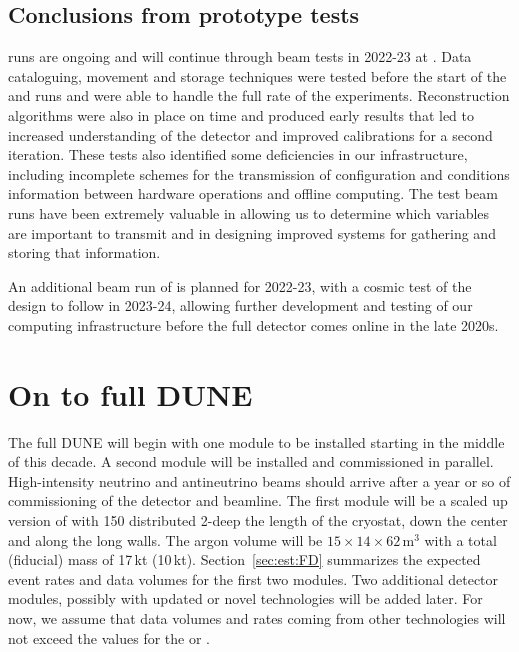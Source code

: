 \documentclass[../main-v1.tex]{subfiles}
\begin{document}
\subsection{Conclusions from prototype tests }

runs are ongoing and will continue through beam tests in 2022-23 at .  Data cataloguing, movement and storage techniques were tested before the start of the  and   runs and were able to handle the full rate of the experiments.   Reconstruction algorithms were also in place on time and %
produced early results that led to increased understanding of the detector and improved calibrations for a second iteration.  These tests also identified some deficiencies in our infrastructure, including incomplete schemes for the transmission of configuration and conditions information between hardware operations and  offline computing.  The test beam runs have been extremely valuable in allowing us to determine which variables are important to transmit and in designing improved systems for gathering and storing that information. 

An additional beam run of   is planned for 2022-23, with a cosmic test of the  design to follow in 2023-24, allowing further development and testing of our computing infrastructure before the full detector comes online in the late 2020s. 


\section{On to full DUNE }\label{sec:intro-fd}

The full DUNE  will begin with one  module to be installed %
starting in the middle of  this decade.  A second  module will be installed and commissioned in parallel.  High-intensity neutrino and antineutrino beams should arrive after a year or so of commissioning of the detector and  beamline.  The first %
module will %
be a scaled up version of  with 150  distributed 2-deep %
the length of the cryostat, down the center and along the long walls. %
The argon volume will be $15\times14\times62$\,m$^3$ with a total (fiducial) mass of 17\,kt (10\,kt).  Section~\ref{sec:est:FD} summarizes the expected event rates and data volumes for the first two modules.  Two additional detector modules, possibly with updated or novel technologies %
will be added later. For now, we assume that data volumes and rates coming from other technologies will not exceed %
the values for the  or .
\end{document}

